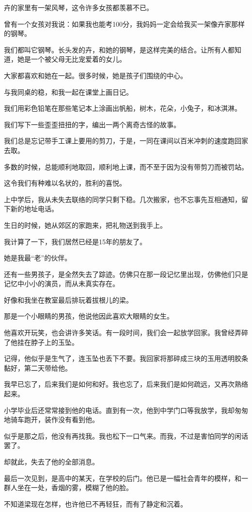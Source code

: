 \documentclass[12pt,a4paper]{article}
\begin{document}
		卉的家里有一架风琴，这令许多女孩都羡慕不已。\par
		曾有一个女孩对我说：如果我也能考100分，我妈妈一定会给我买一架像卉家那样的钢琴。\par
		我们都叫它钢琴。长头发的卉，和她的钢琴，是这样完美的结合。让所有人都知道，她是一个被父母无比宠爱着的女儿。\par
		大家都喜欢和她在一起。很多时候，她是孩子们围绕的中心。

		与我同桌的稳，和我一起在课堂上画日记。\par
		我们用彩色铅笔在那些笔记本上涂画出帆船，树木，花朵，小兔子，和冰淇淋。\par
		我们写下一些歪歪扭扭的字，编出一两个离奇古怪的故事。\par
		我们总是忘记带手工课上要用的剪刀，于是，一同在课间以百米冲刺的速度跑回家去取。\par
		多数的时候，总能顺利地取回，顺利地上课，而不至于因为没有带剪刀而被罚站。\par
		这令我们有种难以名状的，胜利的喜悦。\par
		上中学后，我从未失去联络的同学只剩下稳。几次搬家，也不忘事先互相通知，留下新的地址电话。\par
		生日的时候，她从郊区的家跑来，把礼物送到我手上。\par
		我计算了一下，我们居然已经是15年的朋友了。\par
		她是我最“老”的伙伴。

		还有一些男孩子，是全然失去了踪迹。仿佛只在那一段记忆里出现，仿佛他们只是记忆中小小的演员，而从未真实存在。

		好像和我坐在教室最后排玩着拔根儿的梁。

		那是一个小眼睛的男孩，他说他因此喜欢大眼睛的女生。\par
		他喜欢开玩笑，也会讲许多笑话。有一段时间，我们会一起放学回家。我曾经弄碎了他挂在脖子上的玉坠。\par
		记得，他似乎是生气了，连玉坠也丢下不要。我回家将那碎成三块的玉用透明胶条黏好，第二天带给他。\par
		我早已忘了，后来我们是如何和好。我也忘了，后来我们是如何疏远，又再次熟络起来。\par
		小学毕业后还常常接到他的电话。直到有一次，他到中学门口等我放学，我却匆匆地骑车跑开，装作没有看到他。\par
		似乎是那之后，他没有再找我。我也松下一口气来。而我，不过是害怕同学的闲话罢了。\par
		却就此，失去了他的全部消息。\par
		最后一次见到，是高中的某天，在学校的后门。他已是一幅社会青年的模样，和一群人坐在一处，香烟的雾，模糊了他的脸。\par
		不知道梁现在怎样，也许他已不再轻狂，而有了静定和沉着。
\end{document}
